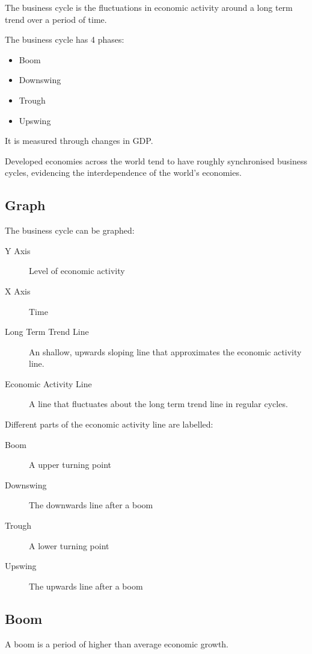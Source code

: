 \documentclass[a4paper,11pt]{report}
\begin{document}
The business cycle is the fluctuations in economic activity around a long term
trend over a period of time.

The business cycle has 4 phases:

\begin{itemize}
\item Boom
\item Downswing
\item Trough
\item Upswing
\end{itemize}

It is measured through changes in GDP.

Developed economies across the world tend to have roughly synchronised business
cycles, evidencing the interdependence of the world's economies.

\subsection{Graph}

The business cycle can be graphed:

\begin{description}
\item [Y Axis] Level of economic activity
\item [X Axis] Time
\item [Long Term Trend Line] An shallow, upwards sloping line that approximates
	the economic activity line.
\item [Economic Activity Line] A line that fluctuates about the long term trend
	line in regular cycles.
\end{description}

Different parts of the economic activity line are labelled:

\begin{description}
\item [Boom] A upper turning point
\item [Downswing] The downwards line after a boom
\item [Trough] A lower turning point
\item [Upswing] The upwards line after a boom
\end{description}

\subsection{Boom}

A boom is a period of higher than average economic growth.
\end{document}
